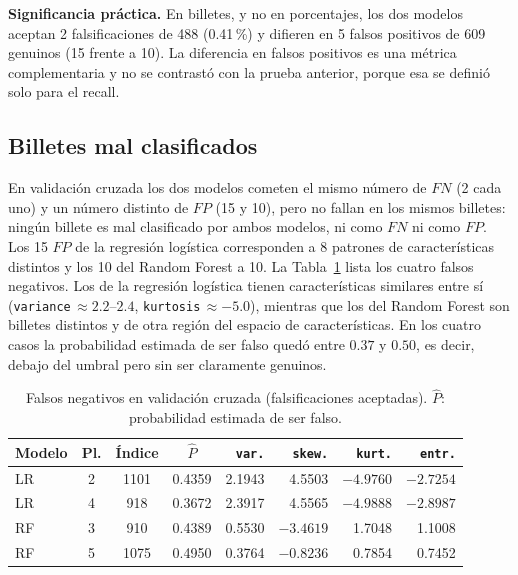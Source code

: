 \documentclass[conference]{IEEEtran}
\begin{document}
	\textbf{Significancia práctica.} En billetes, y no en porcentajes, los dos modelos aceptan 2 falsificaciones de 488 (0.41\,\%) y difieren en 5 falsos positivos de 609 genuinos (15 frente a 10). La diferencia en falsos positivos es una métrica complementaria y no se contrastó con la prueba anterior, porque esa se definió solo para el recall.
	
	\subsection{Billetes mal clasificados}
	
	En validación cruzada los dos modelos cometen el mismo número de $FN$ (2 cada uno) y un número distinto de $FP$ (15 y 10), pero no fallan en los mismos billetes: ningún billete es mal clasificado por ambos modelos, ni como $FN$ ni como $FP$. Los 15 $FP$ de la regresión logística corresponden a 8 patrones de características distintos y los 10 del Random Forest a 10. La Tabla~\ref{tab:fn} lista los cuatro falsos negativos. Los de la regresión logística tienen características similares entre sí (\texttt{variance}\,$\approx 2.2$--$2.4$, \texttt{kurtosis}\,$\approx -5.0$), mientras que los del Random Forest son billetes distintos y de otra región del espacio de características. En los cuatro casos la probabilidad estimada de ser falso quedó entre $0.37$ y $0.50$, es decir, debajo del umbral pero sin ser claramente genuinos.
	
	\begin{table}[t]
		\centering
		\caption{Falsos negativos en validación cruzada (falsificaciones aceptadas). $\hat P$: probabilidad estimada de ser falso.}
		\label{tab:fn}
		\scriptsize
		\setlength{\tabcolsep}{2.5pt}
		\begin{tabular}{@{}lcccrrrr@{}}
			\toprule
			Modelo & Pl. & Índice & $\hat P$ & \texttt{var.} & \texttt{skew.} & \texttt{kurt.} & \texttt{entr.} \\
			\midrule
			LR & 2 & 1101 & 0.4359 & 2.1943 & 4.5503 & $-4.9760$ & $-2.7254$ \\
			LR & 4 & 918 & 0.3672 & 2.3917 & 4.5565 & $-4.9888$ & $-2.8987$ \\
			RF & 3 & 910 & 0.4389 & 0.5530 & $-3.4619$ & 1.7048 & 1.1008 \\
			RF & 5 & 1075 & 0.4950 & 0.3764 & $-0.8236$ & 0.7854 & 0.7452 \\
			\bottomrule
		\end{tabular}
	\end{table}
	
\end{document}
